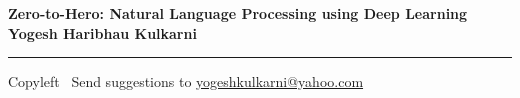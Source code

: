 
\graphicspath{{images/}}

\footnotesize


\begin{center}
\Large{\textbf{Zero-to-Hero: Natural Language Processing using Deep Learning\\ Yogesh Haribhau Kulkarni}}  
\end{center}

\begin{multicols}{2}

\end{multicols}

\rule{\linewidth}{0.25pt}
\scriptsize
Copyleft \textcopyleft\  Send suggestions to 
\href{http://www.yogeshkulkarni.com}{yogeshkulkarni@yahoo.com}


